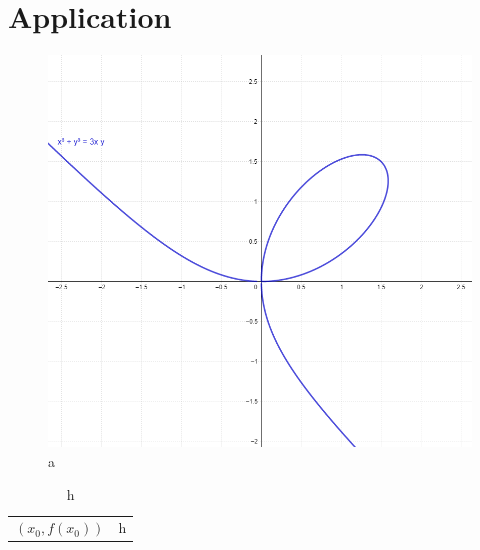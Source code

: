 \documentclass{beamer}
\begin{document}
\section{Application}
\begin{frame}
\begin{figure}[h]
\centering
\includegraphics[scale=0.1]{eqnfig}
\caption{a}
\label{2}
\end{figure}
\end{frame}
\begin{frame}
	\begin{table}[h]
		\centering
		\begin{tabular}{|c|c|}
		$(x_0,f(x_0))$&h\\
		\end{tabular}
		\caption{h}
		\label{2}
	\end{table}
\end{frame}
\end{document}
